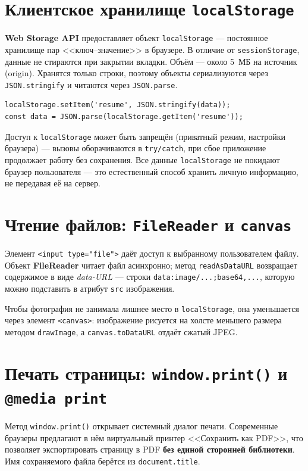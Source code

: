 \section{Клиентское хранилище \texttt{localStorage}}

\textbf{Web Storage API} предоставляет объект \texttt{localStorage} ---
постоянное хранилище пар <<ключ--значение>> в браузере. В отличие от
\texttt{sessionStorage}, данные не стираются при закрытии вкладки. Объём ---
около 5~МБ на источник (origin). Хранятся только строки, поэтому объекты
сериализуются через \texttt{JSON.stringify} и читаются через
\texttt{JSON.parse}.

\begin{lstlisting}[caption={Сохранение и чтение данных},captionpos=b]
localStorage.setItem('resume', JSON.stringify(data));
const data = JSON.parse(localStorage.getItem('resume'));
\end{lstlisting}

Доступ к \texttt{localStorage} может быть запрещён (приватный режим,
настройки браузера) --- вызовы оборачиваются в \texttt{try/catch}, при сбое
приложение продолжает работу без сохранения. Все данные \texttt{localStorage}
не покидают браузер пользователя --- это естественный способ хранить личную
информацию, не передавая её на сервер.

\section{Чтение файлов: \texttt{FileReader} и \texttt{canvas}}

Элемент \texttt{<input type="file">} даёт доступ к выбранному пользователем
файлу. Объект \textbf{FileReader} читает файл асинхронно; метод
\texttt{readAsDataURL} возвращает содержимое в виде \textit{data-URL} ---
строки \texttt{data:image/...;base64,...}, которую можно подставить в
атрибут \texttt{src} изображения.

Чтобы фотография не занимала лишнее место в \texttt{localStorage}, она
уменьшается через элемент \texttt{<canvas>}: изображение рисуется на холсте
меньшего размера методом \texttt{drawImage}, а \texttt{canvas.toDataURL}
отдаёт сжатый JPEG.

\section{Печать страницы: \texttt{window.print()} и \texttt{@media print}}

Метод \texttt{window.print()} открывает системный диалог печати. Современные
браузеры предлагают в нём виртуальный принтер <<Сохранить как PDF>>, что
позволяет экспортировать страницу в PDF \textbf{без единой сторонней
библиотеки}. Имя сохраняемого файла берётся из \texttt{document.title}.

